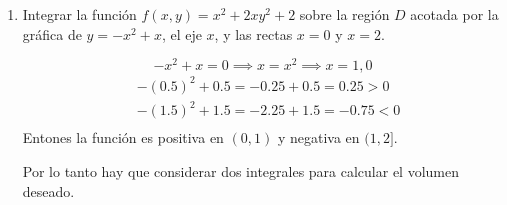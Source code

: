 \documentclass{article}
\begin{document}
\begin{enumerate}
{	}


   \item {
    Integrar la función $f(x,y) = x^2 + 2xy^2 + 2$ sobre la región $D$
		acotada por la gráfica de $y = -x^2 + x$, el eje $x$, y las rectas
		$x = 0$ y $x = 2$.

		\begin{equation*}
			-x^2 + x = 0 \implies x = x^2 \implies x = 1, 0
		\end{equation*}
		\begin{align*}
			&-(0.5)^2 + 0.5 = -0.25 + 0.5 = 0.25 > 0 \\
			&-(1.5)^2 + 1.5 = -2.25 + 1.5 = -0.75 < 0\\
		\end{align*}
		Entones la función es positiva en $(0, 1)$ y negativa en $(1, 2]$.

		Por lo tanto hay que considerar dos integrales para calcular el volumen deseado.

}
\end{enumerate}
\end{document}
